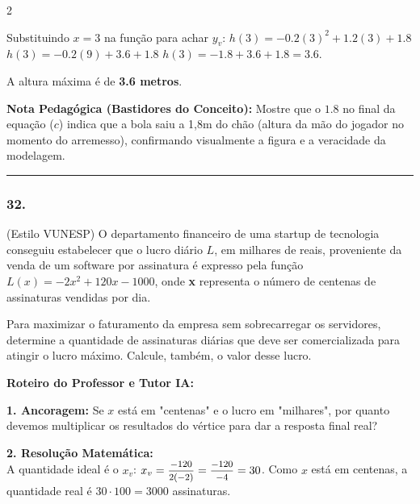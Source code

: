 \begin{multicols*}{2}
\begin{tcolorbox}[colback=CorTitUm!5, colframe=CorTitUm, boxrule=1pt, arc=4pt, left=6pt, right=6pt, top=6pt, bottom=6pt]
    Substituindo $x=3$ na função para achar $y_v$:
    $h(3) = -0.2(3)^2 + 1.2(3) + 1.8$
    $h(3) = -0.2(9) + 3.6 + 1.8$
    $h(3) = -1.8 + 3.6 + 1.8 = 3.6$.
    
    A altura máxima é de \textbf{3.6 metros}.
    \end{tcolorbox}
    \vspace{0.15cm}
    
    \begin{boxexplicacao}
    \textbf{Nota Pedagógica (Bastidores do Conceito):} Mostre que o $1.8$ no final da equação ($c$) indica que a bola saiu a 1,8m do chão (altura da mão do jogador no momento do arremesso), confirmando visualmente a figura e a veracidade da modelagem.
    \end{boxexplicacao}
\fi

\par\vspace{\espacoQuestao}

\noindent\textcolor{CorLinha}{\rule{\linewidth}{0.5pt}} 
\par\vspace{\espacoPreQuestao}
\subsubsection*{32.} 
\begin{enunciadoLiteral}
(Estilo VUNESP) O departamento financeiro de uma startup de tecnologia conseguiu estabelecer que o lucro diário $L$, em milhares de reais, proveniente da venda de um software por assinatura é expresso pela função $L(x) = -2x^2 + 120x - 1000$, onde \textbf{x} representa o número de centenas de assinaturas vendidas por dia.

Para maximizar o faturamento da empresa sem sobrecarregar os servidores, determine a quantidade de assinaturas diárias que deve ser comercializada para atingir o lucro máximo. Calcule, também, o valor desse lucro.
\end{enunciadoLiteral}

\ifgabarito
    \begin{tcolorbox}[colback=CorTitUm!5, colframe=CorTitUm, boxrule=1pt, arc=4pt, left=6pt, right=6pt, top=6pt, bottom=6pt]
    \small\textbf{\textcolor{CorTitUm}{Roteiro do Professor e Tutor IA:}}\par\vspace{0.1cm}
    \color{CinzaEscuro}
    \textbf{1. Ancoragem:} Se $x$ está em "centenas" e o lucro em "milhares", por quanto devemos multiplicar os resultados do vértice para dar a resposta final real?\par\vspace{0.1cm}
    \textbf{2. Resolução Matemática:}\\
    A quantidade ideal é o $x_v$:
    $x_v = \mfrac{-120}{2(-2)} = \mfrac{-120}{-4} = 30$.
    Como $x$ está em centenas, a quantidade real é $30 \cdot 100 = 3000$ assinaturas.
    

\end{tcolorbox}
\end{multicols*}
